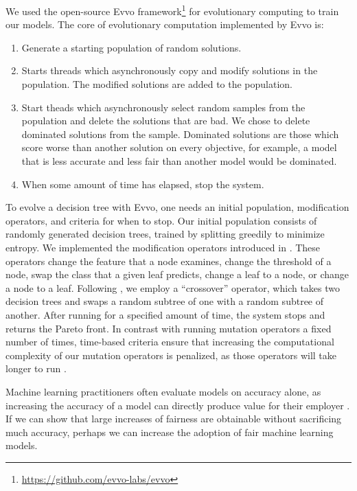 \documentclass{elsarticle}
\begin{document}
We used the open-source Evvo framework\footnote{\href{https://github.com/evvo-labs/evvo}{https://github.com/evvo-labs/evvo}} for evolutionary computing to train our models. The core of evolutionary computation implemented by Evvo is:
\begin{enumerate}
	\item Generate a starting population of random solutions.
	\item Starts threads which asynchronously copy and modify solutions in the population. The modified solutions are added to the population.
	\item Start theads which asynchronously select random samples from the population and delete the solutions that are bad. We chose to delete dominated solutions from the sample. Dominated solutions are those which score worse than another solution on every objective, for example, a model that is less accurate and less fair than another model would be dominated.
	\item When some amount of time has elapsed, stop the system.
\end{enumerate}
To evolve a decision tree with Evvo, one needs an initial population, modification operators, and criteria for when to stop. Our initial population consists of randomly generated decision trees, trained by splitting greedily to minimize entropy. We implemented the modification operators introduced in \citep{Kretowski:2005}. These operators change the feature that a node examines, change the threshold of a node, swap the class that a given leaf predicts, change a leaf to a node, or change a node to a leaf. Following \citep{Papagelis:2000}, we employ a “crossover” operator, which takes two decision trees and swaps a random subtree of one with a random subtree of another. After running for a specified amount of time, the system stops and returns the Pareto front. In contrast with running mutation operators a fixed number of times, time-based criteria ensure that increasing the computational complexity of our mutation operators is penalized, as those operators will take longer to run \citep{Eiben:2015}.

Machine learning practitioners often evaluate models on accuracy alone, as increasing the accuracy of a model can directly produce value for their employer \citep{Packer:2018}. If we can show that large increases of fairness are obtainable without sacrificing much accuracy, perhaps we can increase the adoption of fair machine learning models. 
\end{document}
